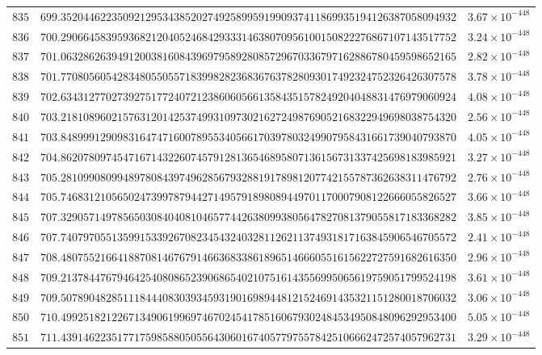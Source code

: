 \documentclass[12pt,reqno]{amsart}
\theoremstyle{remark}
\begin{document}
\begin{longtable}{clc}
$835$ & $699.3520446223509212953438520274925899591990937411869935194126387058094932$ & $3.67\times 10^{-448}$ \\
$836$ & $700.2906645839593682120405246842933314638070956100150822276867107143517752$ & $3.24\times 10^{-448}$ \\
$837$ & $701.0632862639491200381608439697958928085729670336797162886780459598652165$ & $2.82\times 10^{-448}$ \\
$838$ & $701.7708056054283480550557183998282368367637828093017492324752326426307578$ & $3.78\times 10^{-448}$ \\
$839$ & $702.6343127702739275177240721238606056613584351578249204048831476979060924$ & $4.08\times 10^{-448}$ \\
$840$ & $703.2181089602157631201425374993109730216272498769052168322949698038754320$ & $2.56\times 10^{-448}$ \\
$841$ & $703.8489991290983164747160078955340566170397803249907958431661739040793870$ & $4.05\times 10^{-448}$ \\
$842$ & $704.8620780974547167143226074579128136546895807136156731337425698183985921$ & $3.27\times 10^{-448}$ \\
$843$ & $705.2810990809948978084397496285679328819178981207742155787362638311476792$ & $2.76\times 10^{-448}$ \\
$844$ & $705.7468312105650247399787944271495791898089449701170007908122666055826527$ & $3.66\times 10^{-448}$ \\
$845$ & $707.3290571497856503084040810465774426380993805647827081379055817183368282$ & $3.85\times 10^{-448}$ \\
$846$ & $707.7407970551359915339267082345432403281126211374931817163845906546705572$ & $2.41\times 10^{-448}$ \\
$847$ & $708.4807552166418870814676791466368338618965146660551615622727591682616350$ & $2.96\times 10^{-448}$ \\
$848$ & $709.2137844767946425408086523906865402107516143556995065619759051799524198$ & $3.61\times 10^{-448}$ \\
$849$ & $709.5078904828511184440830393459319016989448121524691435321151280018706032$ & $3.06\times 10^{-448}$ \\
$850$ & $710.4992518212267134906199697467024541785160679302484534950848096292953400$ & $5.05\times 10^{-448}$ \\
$851$ & $711.4391462235177175985880505564306016740577975578425106662472574057962731$ & $3.29\times 10^{-448}$ \\

\end{longtable}
\end{document}
